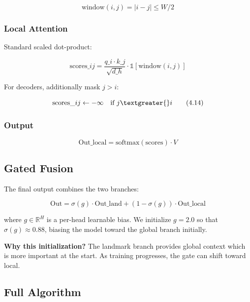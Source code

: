 \[
\text{window}(i, j) = |i - j| \leq W/2
\tag{4.12}
\]

\subsubsection{Local Attention}

Standard scaled dot-product:

\[
\text{scores}\_{ij} = \frac{q\_i \cdot k\_j}{\sqrt{d\_h}} \cdot \mathbb{1}[\text{window}(i,j)]
\tag{4.13}
\]

For decoders, additionally mask $j > i$:

\[
\text{scores}\_{ij} \leftarrow -\infty \quad \text{if } j \textgreater{} i
\tag{4.14}
\]

\subsubsection{Output}

\[
\text{Out}\_\text{local} = \text{softmax}(\text{scores}) \cdot V
\tag{4.15}
\]

\subsection{Gated Fusion}

The final output combines the two branches:

\[
\text{Out} = \sigma(g) \cdot \text{Out}\_\text{land} + (1 - \sigma(g)) \cdot \text{Out}\_\text{local}
\tag{4.16}
\]

where $g \in \mathbb{R}^H$ is a per-head learnable bias. We initialize 
$g = 2.0$ so that $\sigma(g) \approx 0.88$, biasing the model toward the 
global branch initially.

\textbf{Why this initialization?} The landmark branch provides global context 
which is more important at the start. As training progresses, the gate can 
shift toward local.

\subsection{Full Algorithm}

